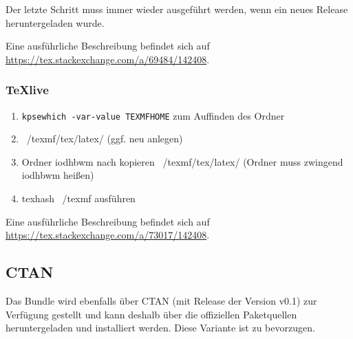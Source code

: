 \documentclass[babel=ngerman,highlight=false]{skdoc}
\let\oldblindtext\blindtext
\renewcommand{\blindtext}{{\color{gray}\oldblindtext}}
\begin{document}
                Der letzte Schritt muss immer wieder ausgeführt werden, wenn ein neues Release heruntergeladen wurde.
                
                Eine ausführliche Beschreibung befindet sich auf \url{https://tex.stackexchange.com/a/69484/142408}.
            
            \subsubsection{TeXlive}
                
                \begin{enumerate}
                    \item \verb|kpsewhich -var-value TEXMFHOME| zum Auffinden des Ordner
                    \item ~/texmf/tex/latex/ (ggf. neu anlegen)
                    \item  Ordner iodhbwm nach kopieren ~/texmf/tex/latex/ (Ordner muss zwingend iodhbwm heißen)
                    \item texhash ~/texmf ausführen
                \end{enumerate}
            
                Eine ausführliche Beschreibung befindet sich auf \url{https://tex.stackexchange.com/a/73017/142408}.
                
        \subsection{CTAN}
            Das Bundle wird ebenfalls über CTAN (mit Release der Version v0.1) zur Verfügung gestellt und kann deshalb über die offiziellen Paketquellen heruntergeladen und installiert werden. Diese Variante ist zu bevorzugen.


    \PrintChanges
    \PrintIndex
\end{document}
